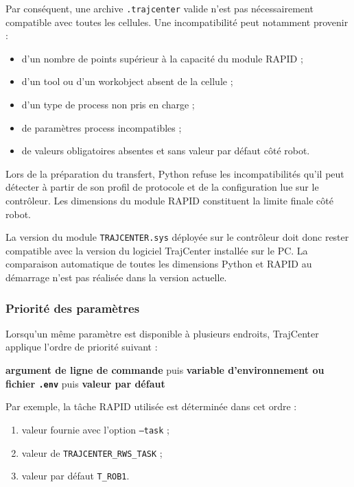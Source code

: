 \documentclass{rapportENSAM}
\begin{document}
Par conséquent, une archive \texttt{.trajcenter} valide n'est pas
nécessairement compatible avec toutes les cellules. Une incompatibilité peut
notamment provenir :

\begin{itemize}
    \item d'un nombre de points supérieur à la capacité du module RAPID ;
    \item d'un tool ou d'un workobject absent de la cellule ;
    \item d'un type de process non pris en charge ;
    \item de paramètres process incompatibles ;
    \item de valeurs obligatoires absentes et sans valeur par défaut côté
    robot.
\end{itemize}

Lors de la préparation du transfert, Python refuse les incompatibilités qu'il peut détecter à partir de son profil de protocole et de la configuration lue sur le contrôleur. Les dimensions du module RAPID constituent la limite finale côté robot.

La version du module \texttt{TRAJCENTER.sys} déployée sur le contrôleur doit donc rester compatible avec la version du logiciel TrajCenter installée sur le PC. La comparaison automatique de toutes les dimensions Python et RAPID au démarrage n'est pas réalisée dans la version actuelle.


\subsubsection{Priorité des paramètres}
\label{subsubsec:pc-configuration-priority}

Lorsqu'un même paramètre est disponible à plusieurs endroits, TrajCenter
applique l'ordre de priorité suivant :

\begin{center}
\textbf{argument de ligne de commande}
\quad puis \quad
\textbf{variable d'environnement ou fichier \texttt{.env}}
\quad puis \quad
\textbf{valeur par défaut}
\end{center}

Par exemple, la tâche RAPID utilisée est déterminée dans cet ordre :

\begin{enumerate}
    \item valeur fournie avec l'option \texttt{--task} ;
    \item valeur de \texttt{TRAJCENTER\_RWS\_TASK} ;
    \item valeur par défaut \texttt{T\_ROB1}.
\end{enumerate}
\end{document}
